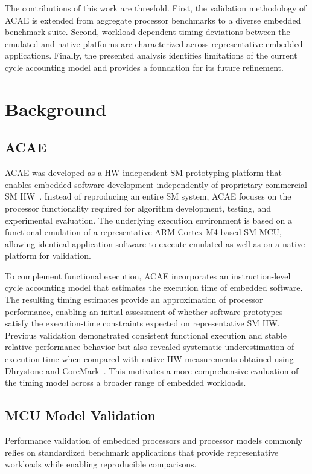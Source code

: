 \documentclass[conference]{IEEEtran}
\begin{document}
		The contributions of this work are threefold.
		First, the validation methodology of \ac{ACAE} is extended from aggregate processor benchmarks to a diverse embedded benchmark suite.
		Second, workload-dependent timing deviations between the emulated and native platforms are characterized across representative embedded applications.
		Finally, the presented analysis identifies limitations of the current cycle accounting model and provides a foundation for its future refinement.

	\section{Background}
		\label{sec:bg}

		\subsection{ACAE}
			\label{sec:bg_acae}
			\ac{ACAE} was developed as a \ac{HW}-independent \ac{SM} prototyping platform that enables embedded software development independently of proprietary commercial \ac{SM} \ac{HW}~\cite{ACAE-REPO}.
			Instead of reproducing an entire \ac{SM} system, \ac{ACAE} focuses on the processor functionality required for algorithm development, testing, and experimental evaluation.
			The underlying execution environment is based on a functional emulation of a representative ARM Cortex-M4-based \ac{SM} \ac{MCU}, allowing identical application software to execute emulated as well as on a native platform for validation.

			To complement functional execution, \ac{ACAE} incorporates an instruction-level cycle accounting model that estimates the execution time of embedded software.
			The resulting timing estimates provide an approximation of processor performance, enabling an initial assessment of whether software prototypes satisfy the execution-time constraints expected on representative \ac{SM} \ac{HW}.
			Previous validation demonstrated consistent functional execution and stable relative performance behavior but also revealed systematic underestimation of execution time when compared with native \ac{HW} measurements obtained using Dhrystone and CoreMark~\cite{ACAE-REPO}.
			This motivates a more comprehensive evaluation of the timing model across a broader range of embedded workloads.

		\subsection{MCU Model Validation}
			\label{sec:bg_valid_emb}
			Performance validation of embedded processors and processor models commonly relies on standardized benchmark applications that provide representative workloads while enabling reproducible comparisons.
\end{document}
